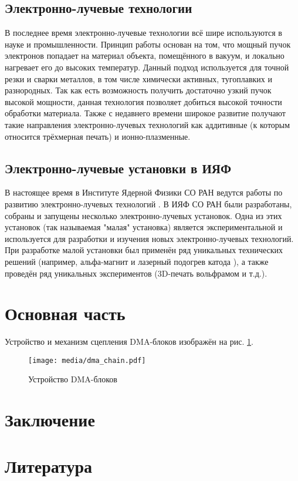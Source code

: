 \documentclass[14pt,russian,a4paper]{extarticle}
\begin{document}
\subsection{Электронно-лучевые технологии}
В последнее время электронно-лучевые технологии всё шире используются в науке и промышленности. Принцип работы основан на том, что мощный пучок электронов попадает на материал объекта, помещённого в вакуум, и локально нагревает его до высоких температур. Данный подход используется для точной резки и сварки металлов, в том числе химически активных, тугоплавких и разнородных. Так как есть возможность получить достаточно узкий пучок высокой мощности, данная технология позволяет добиться высокой точности обработки материала. Также с недавнего времени широкое развитие получают такие направления электронно-лучевых технологий как аддитивные (к которым относится трёхмерная печать) и ионно-плазменные.

\subsection{Электронно-лучевые установки в ИЯФ}
В настоящее время в Институте Ядерной Физики СО РАН ведутся работы по развитию электронно-лучевых технологий \cite{weld_coord}. В ИЯФ СО РАН были разработаны, собраны и запущены несколько электронно-лучевых установок. Одна из этих установок (так называемая "малая" установка) является экспериментальной и используется для разработки и изучения новых электронно-лучевых технологий. При разработке малой установки был применён ряд уникальных технических решений (например, альфа-магнит \cite{alpha_magnet} и лазерный подогрев катода \cite{laser_heat}), а также проведён ряд уникальных экспериментов (3D-печать вольфрамом \cite{wolfram_3d} и т.д.).

\section{Основная часть}
Устройство и механизм сцепления DMA-блоков изображён на рис. \ref{fig:dma}.
\begin{figure}[h!]
    \centerline{\texttt{[image: media/dma\_chain.pdf]}}
    \caption{Устройство DMA-блоков}
    \label{fig:dma}
\end{figure}

\section{Заключение}
\section{Литература}
\end{document}
